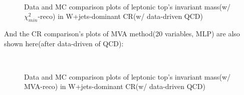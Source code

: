 		\begin{figure}[H]
		\centering
			\\
		\caption{Data and MC comparison plots of leptonic top's invariant mass(w/ $\chi^2_{min}$-reco) in W+jets-dominant CR(w/ data-driven QCD)}
		\label{EventSelReco:fig:chi2_CR1_1C_Mlb_DD}
		\end{figure}
		\FloatBarrier

		And the CR comparison's plots of MVA method(20 variables, MLP) are also shown here(after data-driven of QCD):

		\begin{figure}[H]
		\centering
			\\
		\caption{Data and MC comparison plots of leptonic top's invariant mass(w/ MVA-reco) in W+jets-dominant CR(w/ data-driven QCD)}
		\label{EventSelReco:fig:a05_MLP_CR1_1C_Mlb_DD}
		\end{figure}
		\FloatBarrier

